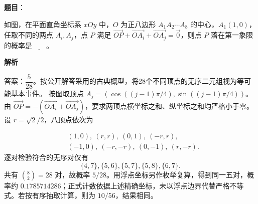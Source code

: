 \begin{answer}

\textbf{题目}：

如图，在平面直角坐标系 \(xOy\) 中，\(O\) 为正八边形 \(A_1A_2\cdots A_8\) 的中心，\(A_1(1,0)\)，任取不同的两点 \(A_i,A_j\)，点 \(P\) 满足 \(\overrightarrow{OP}+\overrightarrow{OA_i}+\overrightarrow{OA_j}=\vec{0}\)，则点 \(P\) 落在第一象限的概率是\(\underline{\qquad}\)。
\nopagebreak[4]
\begin{center}\end{center}
\nopagebreak[4]
\textbf{解析}

答案：\(\dfrac{5}{28}\)。按公开解答采用的古典概型，将28个不同顶点的无序二元组视为等可能基本事件。
按图取顶点 \(A_j=(\cos((j-1)\pi/4),\sin((j-1)\pi/4))\)。由 \(\overrightarrow{OP}=-(\overrightarrow{OA_i}+\overrightarrow{OA_j})\)，要求两顶点横坐标之和、纵坐标之和均严格小于零。设 \(r=\sqrt2/2\)，八顶点依次为 

\nopagebreak[4]
\[
\begin{aligned}
&(1,0),\ (r,r),\ (0,1),\ (-r,r),\\
&(-1,0),\ (-r,-r),\ (0,-1),\ (r,-r).
\end{aligned}
\]
逐对检验符合的无序对仅有
\nopagebreak[4]
\[
\{4,7\},\{5,6\},\{5,7\},\{5,8\},\{6,7\}.
\]
共有 \(\binom82=28\) 对，故概率 \(5/28\)。用浮点坐标另作枚举复算，得到同一五对，概率约 \(0.1785714286\)；正式计数依据上述精确坐标，未以浮点边界代替严格不等式。若按有序抽取计算，则为 \(10/56\)，结果相同。


\end{answer}

